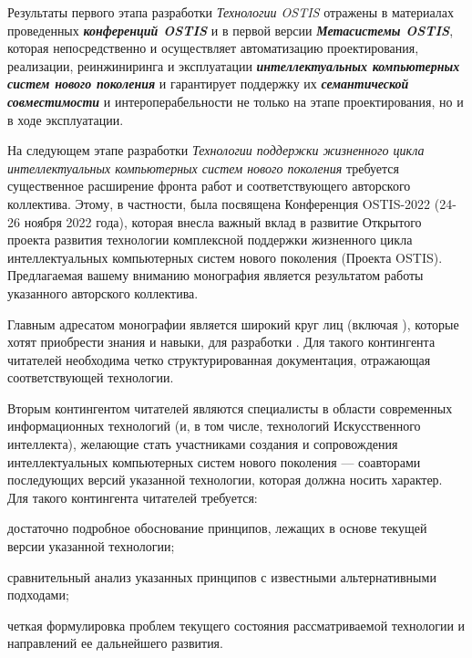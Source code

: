 \begin{partbacktext}
Результаты первого этапа разработки \textit{Технологии OSTIS} отражены в материалах проведенных \textbf{\textit{конференций OSTIS}} и в первой версии \textbf{\textit{Метасистемы OSTIS}}, которая непосредственно и осуществляет автоматизацию проектирования, реализации, реинжиниринга и эксплуатации \textbf{\textit{интеллектуальных компьютерных систем нового поколения}} и гарантирует поддержку их \textbf{\textit{семантической совместимости}} и интероперабельности не только на этапе проектирования, но и в ходе эксплуатации.

На следующем этапе разработки \textit{Технологии поддержки жизненного цикла интеллектуальных компьютерных систем нового поколения} требуется существенное расширение фронта работ и соответствующего авторского коллектива. Этому, в частности, была посвящена Конференция OSTIS-2022 (24-26 ноября 2022 года), которая внесла важный вклад в развитие Открытого проекта развития технологии комплексной поддержки жизненного цикла интеллектуальных компьютерных систем нового поколения (Проекта OSTIS). Предлагаемая вашему вниманию монография является результатом работы указанного авторского коллектива.

Главным адресатом монографии является широкий круг лиц (включая ), которые хотят  приобрести знания и навыки, для разработки      . Для такого контингента читателей необходима четко структурированная документация, отражающая   соответствующей технологии.

Вторым контингентом читателей являются специалисты в области современных информационных технологий (и, в том числе, технологий Искусственного интеллекта), желающие стать участниками     создания и сопровождения интеллектуальных компьютерных систем нового поколения --- соавторами последующих версий указанной технологии, которая должна носить  характер. Для такого контингента читателей требуется:
\begin{textitemize}
	\item достаточно подробное обоснование принципов, лежащих в основе текущей версии указанной технологии; 
	\item сравнительный анализ указанных принципов с известными альтернативными подходами; 
	\item четкая формулировка проблем текущего состояния рассматриваемой технологии и направлений ее дальнейшего развития.
\end{textitemize}


\end{partbacktext}
